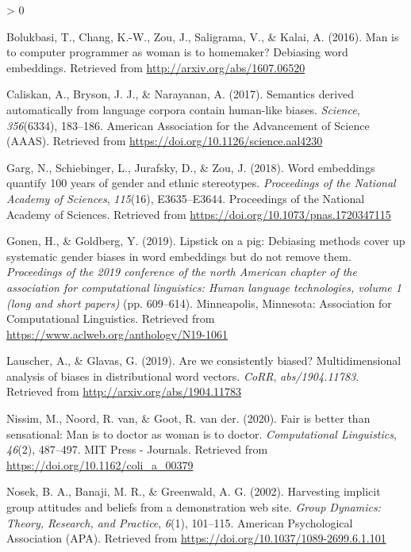 \documentclass[
  10pt,
  dvipsnames,enabledeprecatedfontcommands]{scrartcl}
\newlength{\cslhangindent}
\newenvironment{CSLReferences}[2] %
 {%
  \setlength{\parindent}{0pt}
  \ifodd #1 \everypar{\setlength{\hangindent}{\cslhangindent}}\ignorespaces\fi
  \ifnum #2 > 0
  \setlength{\parskip}{#2\baselineskip}
  \fi
 }%
 {}
\begin{document}
\vspace{-3mm}

\hypertarget{refs}{}
\begin{CSLReferences}{1}{0}
\leavevmode\hypertarget{ref-bolukbasi2016man}{}%
Bolukbasi, T., Chang, K.-W., Zou, J., Saligrama, V., \& Kalai, A.
(2016). Man is to computer programmer as woman is to homemaker?
Debiasing word embeddings. Retrieved from
\url{http://arxiv.org/abs/1607.06520}

\leavevmode\hypertarget{ref-Caliskan2017semanticsBiases}{}%
Caliskan, A., Bryson, J. J., \& Narayanan, A. (2017). Semantics derived
automatically from language corpora contain human-like biases.
\emph{Science}, \emph{356}(6334), 183--186. American Association for the
Advancement of Science ({AAAS}). Retrieved from
\url{https://doi.org/10.1126/science.aal4230}

\leavevmode\hypertarget{ref-Garg2018years}{}%
Garg, N., Schiebinger, L., Jurafsky, D., \& Zou, J. (2018). Word
embeddings quantify 100 years of gender and ethnic stereotypes.
\emph{Proceedings of the National Academy of Sciences}, \emph{115}(16),
E3635--E3644. Proceedings of the National Academy of Sciences. Retrieved
from \url{https://doi.org/10.1073/pnas.1720347115}

\leavevmode\hypertarget{ref-Gonen2019lipstick}{}%
Gonen, H., \& Goldberg, Y. (2019). Lipstick on a pig: {D}ebiasing
methods cover up systematic gender biases in word embeddings but do not
remove them. \emph{Proceedings of the 2019 conference of the north
{A}merican chapter of the association for computational linguistics:
Human language technologies, volume 1 (long and short papers)} (pp.
609--614). Minneapolis, Minnesota: Association for Computational
Linguistics. Retrieved from
\url{https://www.aclweb.org/anthology/N19-1061}

\leavevmode\hypertarget{ref-Lauscher2019multidimensional}{}%
Lauscher, A., \& Glavas, G. (2019). Are we consistently biased?
Multidimensional analysis of biases in distributional word vectors.
\emph{CoRR}, \emph{abs/1904.11783}. Retrieved from
\url{http://arxiv.org/abs/1904.11783}

\leavevmode\hypertarget{ref-Nissim2020fair}{}%
Nissim, M., Noord, R. van, \& Goot, R. van der. (2020). Fair is better
than sensational: Man is to doctor as woman is to doctor.
\emph{Computational Linguistics}, \emph{46}(2), 487--497. {MIT} Press -
Journals. Retrieved from \url{https://doi.org/10.1162/coli_a_00379}

\leavevmode\hypertarget{ref-Nosek2002harvesting}{}%
Nosek, B. A., Banaji, M. R., \& Greenwald, A. G. (2002). Harvesting
implicit group attitudes and beliefs from a demonstration web site.
\emph{Group Dynamics: Theory, Research, and Practice}, \emph{6}(1),
101--115. American Psychological Association ({APA}). Retrieved from
\url{https://doi.org/10.1037/1089-2699.6.1.101}

\end{CSLReferences}
\end{document}
